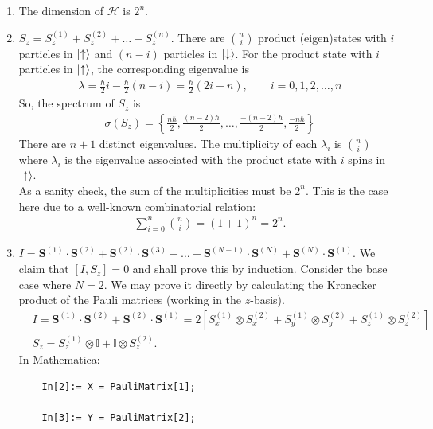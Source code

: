 \documentclass{article}
\theoremstyle{definition}
\newcommand{\ham}{\mathcal{H}}
\newcommand{\f}[2]{\frac{#1}{#2}}
\newcommand{\lp}{\left(}
\newcommand{\rp}{\right)}
\newcommand{\lb}{\left[}
\newcommand{\rb}{\right]}
\newcommand{\lc}{\left\{}
\newcommand{\rc}{\right\}}
\begin{document}
\begin{enumerate}[label=(\alph*)]
	\item The dimension of $\ham$ is $2^n$.
	
	\item $S_z = S_z^{(1)} + S_z^{(2)} + \dots + S_z^{(n)}$. There are ${n\choose i}$ product (eigen)states with $i$ particles in $\ket{\uparrow}$ and $(n-i)$ particles in $\ket{\downarrow}$. For the product state with $i$ particles in $\ket{\uparrow}$, the corresponding eigenvalue is 
	\begin{align*}
	\lambda = \f{\hbar}{2}i - \f{\hbar}{2}(n-i) = \f{\hbar}{2}\lp 2i-n \rp,\quad\quad i = 0,1,2,\dots,n
	\end{align*}
	So, the spectrum of $S_z$ is 
	\begin{align*}
	\sigma(S_z) = \lc \f{n\hbar}{2}, \f{(n-2)\hbar}{2},\dots, \f{-(n-2)\hbar}{2}, \f{-n\hbar}{2}   \rc
	\end{align*}
	There are $n+1$ distinct eigenvalues. The multiplicity of each $\lambda_i$ is ${n\choose{i}}$ where $\lambda_i$ is the eigenvalue associated with the product state with $i$ spins in $\ket{\uparrow}$. \\
	
	As a sanity check, the sum of the multiplicities must be $2^n$. This is the case here due to a well-known combinatorial relation:
	\begin{align*}
	\sum_{i=0}^n {n\choose{i}} = (1+1)^n = 2^n.
	\end{align*}
	
	\item $I = \mathbf{S}^{(1)}\cdot \mathbf{S}^{(2)}+ \mathbf{S}^{(2)}\cdot \mathbf{S}^{(3)} + \dots + \mathbf{S}^{(N-1)}\cdot \mathbf{S}^{(N)}+ \mathbf{S}^{(N)}\cdot \mathbf{S}^{(1)}$. We claim that $[I,S_z] = 0$ and shall prove this by induction. Consider the base case where $N=2$. We may prove it directly by calculating the Kronecker product of the Pauli matrices (working in the $z$-basis).
	\begin{align*}
	&I = \mathbf{S}^{(1)} \cdot \mathbf{S}^{(2)} + \mathbf{S}^{(2)}\cdot \mathbf{S}^{(1)} = 2\lb S_x^{(1)}\otimes S_x^{(2)} + S_y^{(1)} \otimes S_y^{(2)} + S_z^{(1)}\otimes S_z^{(2)}  \rb\\
	&S_z = S_z^{(1)} \otimes \mathbb{I} + \mathbb{I}\otimes S_z^{(2)}.
	\end{align*}
	In Mathematica:
	\begin{lstlisting}
	In[2]:= X = PauliMatrix[1];
	
	In[3]:= Y = PauliMatrix[2];
	

\end{lstlisting}
\end{enumerate}
\end{document}
